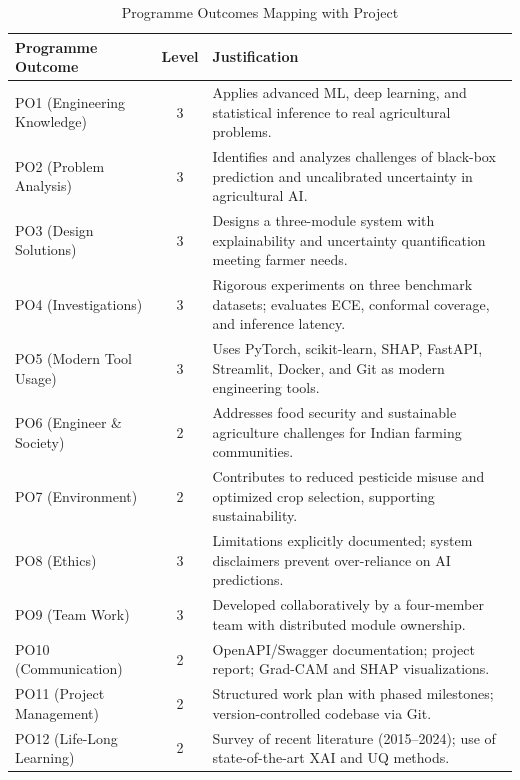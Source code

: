 \documentclass[12pt,a4paper]{report}
\begin{document}
\begin{table}[h!]
\centering
\renewcommand{\arraystretch}{1.3}
\setlength{\tabcolsep}{6pt}
\caption{Programme Outcomes Mapping with Project}
\label{tab:po_mapping}
\begin{tabular}{|L{2.8cm}|c|L{8cm}|}
\hline
\textbf{Programme Outcome} & \textbf{Level} & \textbf{Justification} \\
\hline
PO1 (Engineering Knowledge) & 3 & Applies advanced ML, deep learning, and statistical inference to real agricultural problems. \\
\hline
PO2 (Problem Analysis) & 3 & Identifies and analyzes challenges of black-box prediction and uncalibrated uncertainty in agricultural AI. \\
\hline
PO3 (Design Solutions) & 3 & Designs a three-module system with explainability and uncertainty quantification meeting farmer needs. \\
\hline
PO4 (Investigations) & 3 & Rigorous experiments on three benchmark datasets; evaluates ECE, conformal coverage, and inference latency. \\
\hline
PO5 (Modern Tool Usage) & 3 & Uses PyTorch, scikit-learn, SHAP, FastAPI, Streamlit, Docker, and Git as modern engineering tools. \\
\hline
PO6 (Engineer \& Society) & 2 & Addresses food security and sustainable agriculture challenges for Indian farming communities. \\
\hline
PO7 (Environment) & 2 & Contributes to reduced pesticide misuse and optimized crop selection, supporting sustainability. \\
\hline
PO8 (Ethics) & 3 & Limitations explicitly documented; system disclaimers prevent over-reliance on AI predictions. \\
\hline
PO9 (Team Work) & 3 & Developed collaboratively by a four-member team with distributed module ownership. \\
\hline
PO10 (Communication) & 2 & OpenAPI/Swagger documentation; project report; Grad-CAM and SHAP visualizations. \\
\hline
PO11 (Project Management) & 2 & Structured work plan with phased milestones; version-controlled codebase via Git. \\
\hline
PO12 (Life-Long Learning) & 2 & Survey of recent literature (2015--2024); use of state-of-the-art XAI and UQ methods. \\
\hline
\end{tabular}
\end{table}
\end{document}
